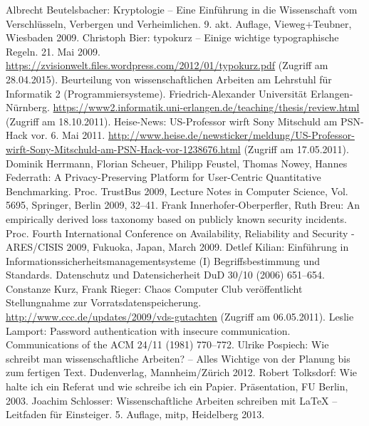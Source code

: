 \documentclass[
    12pt,
    headings=small,
    parskip=half,           %
    bibliography=totoc,
    numbers=noenddot,       %
    open=any,               %
    ]{scrreprt}
\begin{document}
\begin{raggedright}%
\begin{thebibliography}{XXXXXXXX}
	 Albrecht Beutelsbacher: Kryptologie -- Eine Einführung in die Wissenschaft vom Verschlüsseln, Verbergen und Verheimlichen. 9. akt. Auflage, Vieweg+Teubner, Wiesbaden 2009.
	 Christoph Bier: typokurz -- Einige wichtige typographische Regeln. 21. Mai 2009. \url{https://zvisionwelt.files.wordpress.com/2012/01/typokurz.pdf} (Zugriff am 28.04.2015).
	 Beurteilung von wissenschaftlichen Arbeiten am Lehrstuhl für Informatik 2 (Programmiersysteme). Friedrich-Alexander Universität Erlangen-Nürnberg. \url{https://www2.informatik.uni-erlangen.de/teaching/thesis/review.html} (Zugriff am 18.10.2011).
	 Heise-News: US-Professor wirft Sony Mitschuld am PSN-Hack vor. 6. Mai 2011. \url{http://www.heise.de/newsticker/meldung/US-Professor-wirft-Sony-Mitschuld-am-PSN-Hack-vor-1238676.html} (Zugriff am 17.05.2011).
	 Dominik Herrmann, Florian Scheuer, Philipp Feustel, Thomas Nowey, Hannes Federrath: A Privacy-Preserving Platform for User-Centric Quantitative Benchmarking. Proc. TrustBus 2009, Lecture Notes in Computer Science, Vol. 5695, Springer, Berlin 2009, 32--41.
	 Frank Innerhofer-Oberperfler, Ruth Breu: An empirically derived loss taxonomy based on publicly known security incidents. Proc. Fourth International Conference on Availability, Reliability and Security - ARES/CISIS 2009, Fukuoka, Japan, March 2009.
	 Detlef Kilian: Einführung in Informationssicherheitsmanagementsysteme (I) Begriffsbestimmung und Standards. Datenschutz und Datensicherheit DuD 30/10 (2006) 651--654.
	 Constanze Kurz, Frank Rieger: Chaos Computer Club veröffentlicht Stellungnahme zur Vorratsdatenspeicherung. \url{http://www.ccc.de/updates/2009/vds-gutachten} (Zugriff am 06.05.2011).
	 Leslie Lamport: Password authentication with insecure communication. Communications of the ACM 24/11 (1981) 770--772.
	 Ulrike Pospiech: Wie schreibt man wissenschaftliche Arbeiten? -- Alles Wichtige von der Planung bis zum fertigen Text. Dudenverlag, Mannheim/Zürich 2012.
	 Robert Tolksdorf: Wie halte ich ein Referat und wie schreibe ich ein Papier. Präsentation, FU Berlin, 2003.
	 Joachim Schlosser: Wissenschaftliche Arbeiten schreiben mit LaTeX -- Leitfaden für Einsteiger. 5. Auflage, mitp, Heidelberg 2013.

\end{thebibliography}
\end{raggedright}
\end{document}
